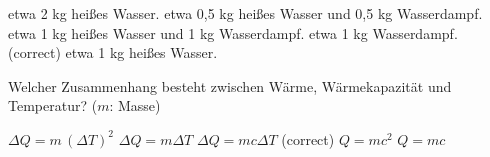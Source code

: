 \documentclass[11pt]{exam}
\begin{document}
\begin{questions}
\begin{choices}
	\choice etwa 2 kg heißes Wasser.
	\choice etwa 0,5 kg heißes Wasser und 0,5 kg Wasserdampf.
	\choice etwa 1 kg heißes Wasser und 1 kg Wasserdampf.
	\choice etwa 1 kg Wasserdampf. (correct)
	\choice etwa 1 kg heißes Wasser.
\end{choices}

\vspace{3mm}\question Welcher Zusammenhang besteht zwischen Wärme, Wärmekapazität und Temperatur? (\(m\): Masse)

\begin{choices}
	\choice \(\Delta Q = m \, (\Delta T)^2\)
	\choice \(\Delta Q = m \Delta T\)
	\choice \(\Delta Q = m c \Delta T\) (correct)
	\choice \(Q = m c^2\)
	\choice \(Q = m c\)
\end{choices}

\vspace{3mm}\end{questions}
\end{document}
